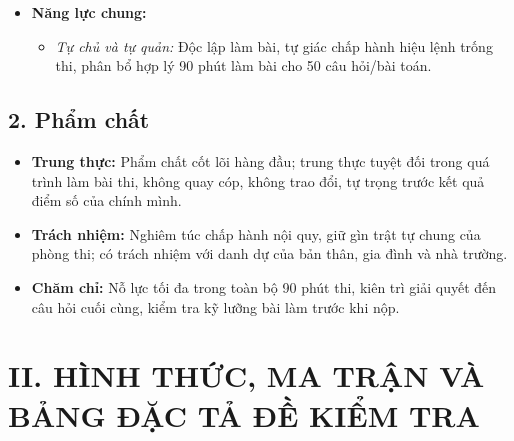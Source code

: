 \documentclass[12pt, a4paper]{article}
\begin{document}
\begin{itemize}[leftmargin=1.2cm]
    \item \textbf{Năng lực chung:}
    \begin{itemize}[leftmargin=0.6cm]
        \item \textit{Tự chủ và tự quản:} Độc lập làm bài, tự giác chấp hành hiệu lệnh trống thi, phân bổ hợp lý 90 phút làm bài cho 50 câu hỏi/bài toán.
    \end{itemize}
\end{itemize}

\subsection*{2. Phẩm chất}

\begin{itemize}[leftmargin=1.2cm]
    \item \textbf{Trung thực:} Phẩm chất cốt lõi hàng đầu; trung thực tuyệt đối trong quá trình làm bài thi, không quay cóp, không trao đổi, tự trọng trước kết quả điểm số của chính mình.
    \item \textbf{Trách nhiệm:} Nghiêm túc chấp hành nội quy, giữ gìn trật tự chung của phòng thi; có trách nhiệm với danh dự của bản thân, gia đình và nhà trường.
    \item \textbf{Chăm chỉ:} Nỗ lực tối đa trong toàn bộ 90 phút thi, kiên trì giải quyết đến câu hỏi cuối cùng, kiểm tra kỹ lưỡng bài làm trước khi nộp.
\end{itemize}

\section*{II. HÌNH THỨC, MA TRẬN VÀ BẢNG ĐẶC TẢ ĐỀ KIỂM TRA}
\end{document}
